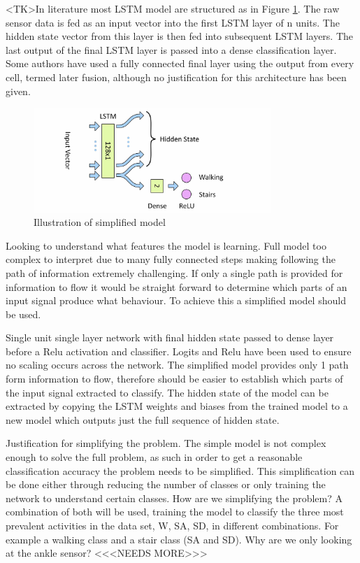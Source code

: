 \documentclass[sensors,article,submit,moreauthors,pdftex]{Definitions/mdpi}
\begin{document}
<TK>In literature most LSTM model are structured as in Figure \ref{fig:full_lstm_model}. The raw sensor data is fed as an input vector into the first LSTM layer of n units. The hidden state vector from this layer is then fed into subsequent LSTM layers. The last output of the final LSTM layer is passed into a dense classification layer. Some authors have used a fully connected final layer using the output from every cell, termed later fusion, although no justification for this architecture has been given.

\begin{figure}[!htb]
    \centering
    \includegraphics[width=0.8\textwidth]{Figures/lstm/Simplified_Network.jpg}
    \caption{Illustration of simplified model}
    \label{fig:full_lstm_model}
\end{figure}

Looking to understand what features the model is learning. Full model too complex to interpret due to many fully connected steps making following the path of information extremely challenging. If only a single path is provided for information to flow it would be straight forward to determine which parts of an input signal produce what behaviour. To achieve this a simplified model should be used.

Single unit single layer network with final hidden state passed to dense layer before a Relu activation and classifier. Logits and Relu have been used to ensure no scaling occurs across the network. The simplified model provides only 1 path form information to flow, therefore should be easier to establish which parts of the input signal extracted to classify. The hidden state of the model can be extracted by copying the LSTM weights and biases from the trained model to a new model which outputs just the full sequence of hidden state.

Justification for simplifying the problem. The simple model is not complex enough to solve the full problem, as such in order to get a reasonable classification accuracy the problem needs to be simplified. This simplification can be done either through reducing the number of classes or only training the network to understand certain classes. How are we simplifying the problem? A combination of both will be used, training the model to classify the three most prevalent activities in the data set, W, SA, SD, in different combinations. For example a walking class and a stair class (SA and SD). Why are we only looking at the ankle sensor? <<<NEEDS MORE>>>
\end{document}
